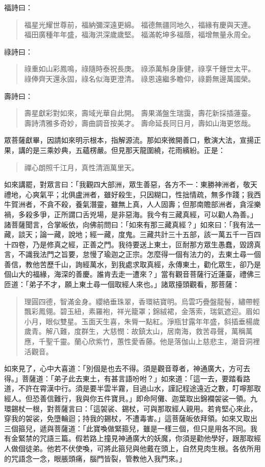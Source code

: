 福詩曰：
\begin{quote}
福星光耀世尊前，福納彌深遠更綿。
福德無疆同地久，福緣有慶與天連。
福田廣種年年盛，福海洪深歲歲堅。
福滿乾坤多福蔭，福增無量永周全。
\end{quote}

祿詩曰：
\begin{quote}
祿重如山彩鳳鳴，祿隨時泰祝長庚。
祿添萬斛身康健，祿享千鍾世太平。
祿俸齊天還永固，祿名似海更澄清。
祿恩遠繼多瞻仰，祿爵無邊萬國榮。
\end{quote}

壽詩曰：
\begin{quote}
壽星獻彩對如來，壽域光華自此開。
壽果滿盤生瑞靄，壽花新採插蓮臺。
壽詩清雅多奇妙，壽曲調音按美才。
壽命延長同日月，壽如山海更悠哉。
\end{quote}

眾菩薩獻畢，因請如來明示根本，指解源流。那如來微開善口，敷演大法，宣揚正果，講的是三乘妙典，五蘊楞嚴。但見那天龍圍繞，花雨繽紛。正是：
\begin{quote}
禪心朗照千江月，真性清涵萬里天。
\end{quote}

如來講罷，對眾言曰：「我觀四大部洲，眾生善惡，各方不一：東勝神洲者，敬天禮地，心爽氣平；北俱盧洲者，雖好殺生，只因糊口，性拙情疏，無多作踐；我西牛賀洲者，不貪不殺，養氣潛靈，雖無上真，人人固壽；但那南贍部洲者，貪淫樂禍，多殺多爭，正所謂口舌兇場，是非惡海。我今有三藏真經，可以勸人為善。」諸菩薩聞言，合掌皈依，向佛前問曰：「如來有那三藏真經？」如來曰：「我有法一藏，談天；論一藏，說地；經一藏，度鬼。三藏共計三十五部，該一萬五千一百四十四卷，乃是修真之經，正善之門。我待要送上東土，叵耐那方眾生愚蠢，毀謗真言，不識我法門之旨要，怠慢了瑜迦之正宗。怎麼得一個有法力的，去東土尋一個善信，教他苦歷千山，詢經萬水，到我處求取真經，永傳東土，勸化眾生，卻乃是個山大的福緣，海深的善慶。誰肯去走一遭來？」當有觀音菩薩行近蓮臺，禮佛三匝道：「弟子不才，願上東土尋一個取經人來也。」諸眾擡頭觀看，那菩薩：
\begin{quote}
理圓四德，智滿金身。纓絡垂珠翠，香環結寶明。烏雲巧疊盤龍髻，繡帶輕飄彩鳳翎。碧玉紐，素羅袍，祥光籠罩；錦絨裙，金落索，瑞氣遮迎。眉如小月，眼似雙星。玉面天生喜，朱脣一點紅。淨瓶甘露年年盛，斜插垂楊歲歲青。解八難，度群生，大慈憫：故鎮太山，居南海，救苦尋聲，萬稱萬應，千聖千靈。蘭心欣紫竹，蕙性愛香藤。他是落伽山上慈悲主，潮音洞裡活觀音。
\end{quote}

如來見了，心中大喜道：「別個是也去不得。須是觀音尊者，神通廣大，方可去得。」菩薩道：「弟子此去東土，有甚言語吩咐？」如來道：「這一去，要踏看路道，不許在霄漢中行。須是要半雲半霧，目過山水，謹記程途遠近之數，叮嚀那取經人。但恐善信難行，我與你五件寶貝。」即命阿儺、迦葉取出錦襴袈裟一領。九環錫杖一根，對菩薩言曰：「這袈裟、錫杖，可與那取經人親用。若肯堅心來此，穿我的袈裟，免墮輪迴；持我的錫杖，不遭毒害。」這菩薩皈依拜領。如來又取出三個箍兒，遞與菩薩道：「此寶喚做緊箍兒，雖是一樣三個，但只是用各不同。我有金緊禁的咒語三篇。假若路上撞見神通廣大的妖魔，你須是勸他學好，跟那取經人做個徒弟。他若不伏使喚，可將此箍兒與他戴在頭上，自然見肉生根。各依所用的咒語念一念，眼脹頭痛，腦門皆裂，管教他入我門來。」

